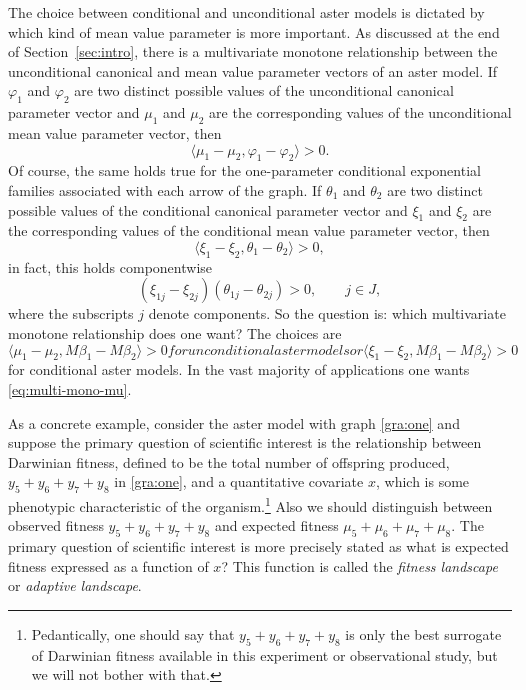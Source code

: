 \documentclass[11pt]{article}
\newcommand{\inner}[1]{\langle #1 \rangle}
\begin{document}
The choice between conditional and unconditional aster models is
dictated by which kind of mean value parameter is more important.
As discussed at the end of Section~\ref{sec:intro}, there is a multivariate
monotone relationship between the unconditional canonical and mean value
parameter vectors
of an aster model.  If $\varphi_1$ and $\varphi_2$ are two distinct possible
values of the unconditional canonical parameter vector and $\mu_1$ and $\mu_2$
are the corresponding values of the unconditional mean value parameter vector,
then
$$
   \inner{\mu_1 - \mu_2, \varphi_1 - \varphi_2} > 0.
$$
Of course, the same holds true for the one-parameter conditional exponential
families associated with each arrow of the graph.  If $\theta_1$ and $\theta_2$
are two distinct possible values of the conditional canonical parameter vector
and $\xi_1$ and $\xi_2$ are the
corresponding values of the conditional mean value parameter vector, then
$$
   \inner{\xi_1 - \xi_2, \theta_1 - \theta_2} > 0,
$$
in fact, this holds componentwise
$$
   (\xi_{1 j} - \xi_{2 j}) (\theta_{1 j} - \theta_{2 j}) > 0,
   \qquad j \in J,
$$
where the subscripts $j$ denote components.  So the question is: which
multivariate monotone relationship does one want?  The choices are
\begin{subequations}
\begin{equation} \label{eq:multi-mono-mu}
   \inner{\mu_1 - \mu_2, M \beta_1 - M \beta_2} > 0
\end{equation}
for unconditional aster models or
\begin{equation} \label{eq:multi-mono-xi}
   \inner{\xi_1 - \xi_2, M \beta_1 - M \beta_2} > 0
\end{equation}
\end{subequations}
for conditional aster models.  In the vast majority of applications
one wants \eqref{eq:multi-mono-mu}.

As a concrete example, consider the aster model with graph \eqref{gra:one}
and suppose the primary question of scientific interest is the relationship
between Darwinian fitness, defined to be the total number of offspring produced,
$y_5 + y_6 + y_7 + y_8$ in \eqref{gra:one}, and a quantitative covariate $x$,
which is some phenotypic characteristic of the organism.\footnote{Pedantically,
one should say that $y_5 + y_6 + y_7 + y_8$ is only the best surrogate of
Darwinian fitness available in this experiment or observational study,
but we will not bother with that.}
Also we should distinguish between observed fitness $y_5 + y_6 + y_7 + y_8$
and expected fitness $\mu_5 + \mu_6 + \mu_7 + \mu_8$.
The primary question of scientific interest is more precisely stated
as what is expected fitness expressed as a function of $x$?  This function
is called the \emph{fitness landscape} or \emph{adaptive landscape}.
\end{document}
